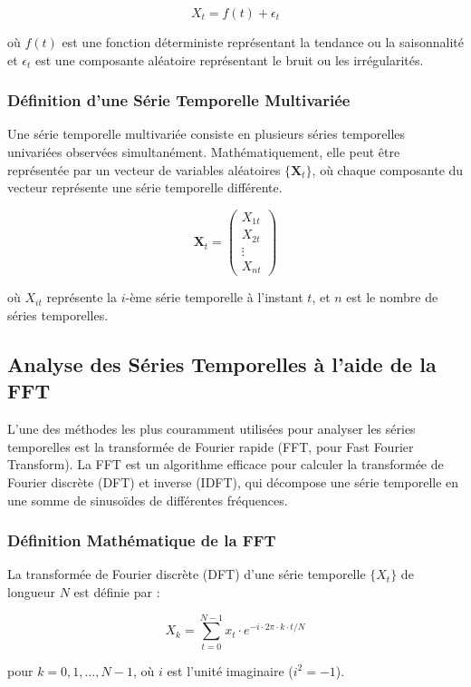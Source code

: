 \[ X_t = f(t) + \epsilon_t \]

où $f(t)$ est une fonction déterministe représentant la tendance ou la
saisonnalité et $\epsilon_t$ est une composante aléatoire représentant le bruit
ou les irrégularités.

\subsubsection*{Définition d'une Série Temporelle Multivariée}

Une série temporelle multivariée consiste en plusieurs séries temporelles
univariées observées simultanément. Mathématiquement, elle peut être
représentée par un vecteur de variables aléatoires $\{\mathbf{X}_t\}$, où
chaque composante du vecteur représente une série temporelle différente.

\[ \mathbf{X}_t = \begin{pmatrix} X_{1t} \\ X_{2t} \\ \vdots \\ X_{nt} \end{pmatrix} \]

où $X_{it}$ représente la $i$-ème série temporelle à l'instant $t$, et $n$ est
le nombre de séries temporelles.

\subsection*{Analyse des Séries Temporelles à l'aide de la FFT}

L'une des méthodes les plus couramment utilisées pour analyser les séries
temporelles est la transformée de Fourier rapide (FFT, pour Fast Fourier
Transform). La FFT est un algorithme efficace pour calculer la transformée de
Fourier discrète (DFT) et inverse (IDFT), qui décompose une série temporelle en
une somme de sinusoïdes de différentes fréquences.

\subsubsection*{Définition Mathématique de la FFT}

La transformée de Fourier discrète (DFT) d'une série temporelle $\{X_t\}$ de
longueur $N$ est définie par :

\[ X_k = \sum_{t=0}^{N-1} x_t \cdot e^{-i \cdot 2\pi \cdot k \cdot t / N} \]

pour $k = 0, 1, \ldots, N-1$, où $i$ est l'unité imaginaire ($i^2 = -1$).

